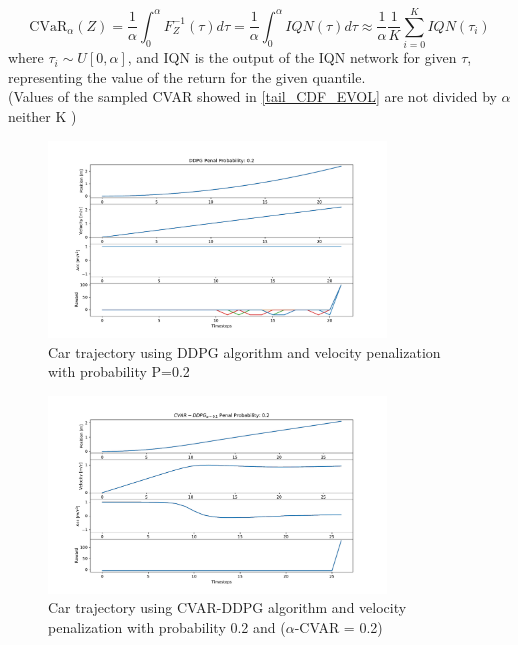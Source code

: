 \begin{equation}
        \text{CVaR}_\alpha (Z) = \frac{1}{\alpha} \int_{0}^{\alpha} F^{-1}_Z(\tau) d\tau=\frac{1}{\alpha} \int_{0}^{\alpha} IQN(\tau) d\tau \approx 
        \frac{1}{\alpha} \frac{1}{K}\sum_{i=0}^K IQN(\tau_i) 
\end{equation}
where $\tau_i \sim U[0,\alpha]$, and IQN is the output of the IQN network for given $\tau$, representing the
value of the return for the given quantile.\\
(Values of the sampled CVAR showed in \ref{tail_CDF_EVOL} are not divided by $\alpha$ neither K )
\begin{figure}[ht]
        \centering
        \includegraphics[width=0.8\textwidth]{images/Car/DDPG/Trajectory_DDPG_ppenal02.pdf}
        \caption{Car trajectory using DDPG algorithm and velocity penalization with
        probability P=0.2}
        \label{traj_ddpg_probpenal0.2}
    
\end{figure}

\begin{figure}[ht]
        \centering
        \includegraphics[width=0.8\textwidth]{images/Car/CVAR/Trajectory_CVAR_ppenal02.pdf}
        \caption{Car trajectory using CVAR-DDPG algorithm and velocity penalization with probability 0.2 and ($\alpha$-CVAR = 0.2)}
        \label{traj_cvar_ddpg_probpenal0.2_cvar0.2}
    
\end{figure}

